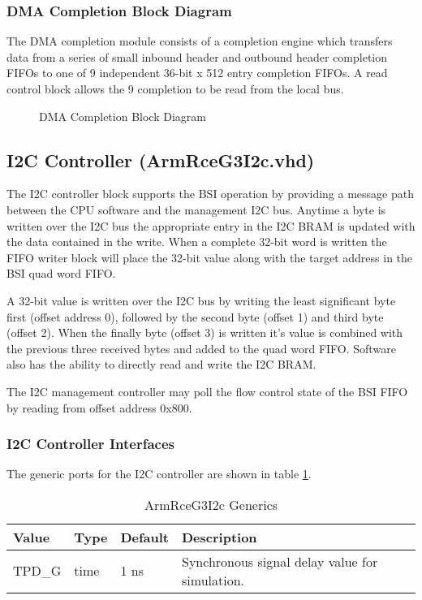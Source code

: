 \documentclass[11pt]{article}
\begin{document}
\subsubsection{DMA Completion Block Diagram}

The DMA completion module consists of a completion engine which transfers data from a series of small inbound header and outbound header 
completion FIFOs to one of 9 independent 36-bit x 512 entry completion FIFOs. A read control block allows the 9 completion to be read from
the local bus.

\begin{figure}[H]
   \centering
   \caption{DMA Completion Block Diagram}
   \label{fig:dma_comp_block}
\end{figure}

\subsection{I2C Controller (ArmRceG3I2c.vhd)}
\label{subsec:ArmRceG3I2c}

The I2C controller block supports the BSI operation by providing a message path between the CPU software and the management I2C bus. Anytime a 
byte is written over the I2C bus the appropriate entry in the I2C BRAM is updated with the data contained in the write. When a complete 32-bit
word is written the FIFO writer block will place the 32-bit value along with the target address in the BSI quad word FIFO. 

A 32-bit value is written over the I2C bus by writing the least significant byte first (offset address 0), followed by the second byte (offset 1)
and third byte (offset 2). When the finally byte (offset 3) is written it's value is combined with the previous three received bytes and added to
the quad word FIFO. Software also has the ability to directly read and write the I2C BRAM. 

The I2C management controller may poll the flow control state of the BSI FIFO by reading from offset address 0x800.

\subsubsection{I2C Controller Interfaces}

The generic ports for the I2C controller are shown in table \ref{tab:i2c_cntrl_generics}.

\begin{table}[H]
\small
\centering
   \begin{tabular}{| l | l | l | l | }
      \hline \textbf{Value} & \textbf{Type} & \textbf{Default} & \textbf{Description} \\
      \hline TPD\_G          & time     & 1 ns & Synchronous signal delay value for simulation.    \\
      \hline
   \end{tabular}
   \caption{ArmRceG3I2c Generics}
   \label{tab:i2c_cntrl_generics}
\end{table}
\end{document}
